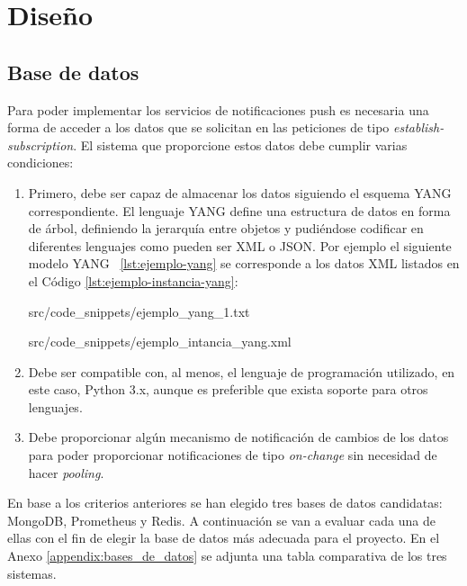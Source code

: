 \chapter{Diseño\label{sec:disenho}}

\section{Base de datos}

Para poder implementar los servicios de notificaciones push es necesaria una forma de acceder a los
datos que se solicitan en las peticiones de tipo \textit{establish-subscription}. El sistema que 
proporcione estos datos debe cumplir varias condiciones:

\begin{enumerate}
    \item Primero, debe ser capaz de almacenar los datos siguiendo el esquema YANG correspondiente. 
    El lenguaje YANG define una estructura de datos en forma de árbol, definiendo la jerarquía entre
    objetos y pudiéndose codificar en diferentes lenguajes como pueden ser \gls{XML} o \gls{JSON}.
    Por ejemplo el siguiente modelo YANG ~\ref{lst:ejemplo-yang} se corresponde a los datos \gls{XML}
    listados en el Código \ref{lst:ejemplo-instancia-yang}:
    
    
                        {src/code_snippets/ejemplo_yang_1.txt}
                        
    
                        {src/code_snippets/ejemplo_intancia_yang.xml}

    \item Debe ser compatible con, al menos, el lenguaje de programación utilizado, en este caso,
    Python 3.x, aunque es preferible que exista soporte para otros lenguajes.
    
    \item Debe proporcionar algún mecanismo de notificación de cambios de los datos para poder
    proporcionar notificaciones de tipo \textit{on-change} sin necesidad de hacer \textit{pooling}.
\end{enumerate}

En base a los criterios anteriores se han elegido tres bases de datos candidatas: MongoDB,
Prometheus y Redis. A continuación se van a evaluar cada una de ellas con el fin de elegir la base de datos más adecuada para el proyecto. En el Anexo \ref{appendix:bases_de_datos} se adjunta una tabla comparativa de los tres sistemas.

